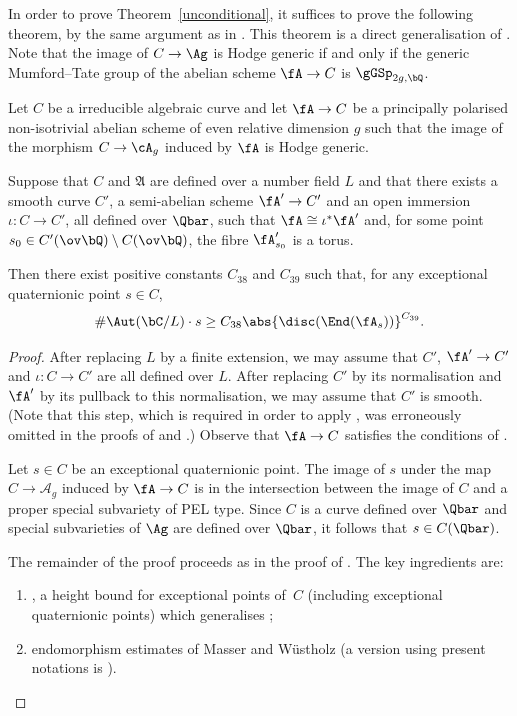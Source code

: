 In order to prove Theorem~\ref{unconditional}, it suffices to prove the following theorem, by the same argument as in \cite[\S6.7]{QRTUI}.
This theorem is a direct generalisation of \cite[Th.\,6.5]{QRTUI}.
Note that the image of $C \to \Ag$ is Hodge generic if and only if the generic Mumford--Tate group of the abelian scheme $\fA \to C$ is $\gGSp_{2g,\bQ}$.

\begin{theorem}\label{EQ-scheme}
Let $C$ be a irreducible algebraic curve and let $\fA\to C$ be a principally polarised non-isotrivial abelian scheme of even relative dimension $g$ such that the image of the morphism $C\to\cA_g$ induced by $\fA$ is Hodge generic.

Suppose that $C$ and $\mathfrak{A}$ are defined over a number field $L$ and that there exists a smooth curve \( C' \), a semi-abelian scheme \( \fA' \to C' \) and an open immersion \( \iota \colon C \to C' \), all defined over \( \Qbar \), such that \( \fA \cong \iota^* \fA' \) and, for some point \( s_0 \in C'(\ov\bQ) \setminus C(\ov\bQ) \), the fibre \( \fA'_{s_0} \) is a torus.

Then there exist positive constants $C_{38}$ and $C_{39}$ such that, for any exceptional quaternionic point $s\in C$,
\[\#\Aut(\bC/L)\cdot s\geq C_{38}\abs{\disc(\End(\fA_s))}^{C_{39}}.\]
\end{theorem}

\begin{proof}
After replacing $L$ by a finite extension, we may assume that \( C' \), \( \fA' \to C' \) and \( \iota \colon C \to C' \) are all defined over $L$.
After replacing $C'$ by its normalisation and~$\fA'$ by its pullback to this normalisation, we may assume that $C'$ is smooth. (Note that this step, which is required in order to apply \cite[Th.\,8.2]{ExCM}, was erroneously omitted in the proofs of \cite[Prop.\,9.2]{ExCM} and \cite[Th.\,6.5]{QRTUI}.)
Observe that \( \fA \to C \) satisfies the conditions of \cite[Th.\,8.2]{ExCM}.

Let $s\in C$ be an exceptional quaternionic point. The image of $s$ under the map $C\rightarrow\mathcal{A}_g$ induced by $\fA\to C$ is in the intersection between the image of $C$ and a proper special subvariety of PEL type.
Since $C$ is a curve defined over $\Qbar$ and special subvarieties of $\Ag$ are defined over $\Qbar$, it follows that $s\in C(\Qbar)$.

The remainder of the proof proceeds as in the proof of \cite[Th.\,6.5]{QRTUI}.
The key ingredients are:
\begin{enumerate}
\item \cite[Th.\,8.2]{ExCM}, a height bound for exceptional points of~$C$ (including exceptional quaternionic points) which generalises \cite[Chap.\,X, Th.\,1.3]{And89};
\item endomorphism estimates of Masser and Wüstholz \cite{MW94} (a version using present notations is \cite[Th.\,6.6]{QRTUI}).
\end{enumerate}
\end{proof}

